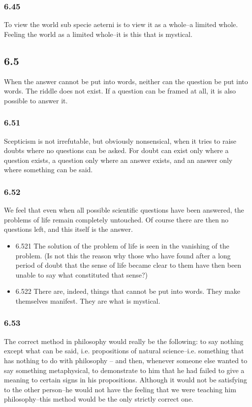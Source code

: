 \documentclass[11pt]{article}
\begin{document}
\subsubsection*{6.45}
\label{sec:orge0630ea}
To view the world sub specie aeterni is to view it as a whole--a
limited whole. Feeling the world as a limited whole--it is this that is
mystical.
\subsection*{6.5}
\label{sec:org35493cb}
When the answer cannot be put into words, neither can the question be
put into words. The riddle does not exist. If a question can be framed at
all, it is also possible to answer it.
\subsubsection*{6.51}
\label{sec:orga311633}
Scepticism is not irrefutable, but obviously nonsensical, when it
tries to raise doubts where no questions can be asked. For doubt can exist
only where a question exists, a question only where an answer exists, and
an answer only where something can be said.
\subsubsection*{6.52}
\label{sec:orgdf4ddaa}
We feel that even when all possible scientific questions have been
answered, the problems of life remain completely untouched. Of course there
are then no questions left, and this itself is the answer.
\begin{itemize}
\item 6.521
\label{sec:org1f577be}
The solution of the problem of life is seen in the vanishing of the
problem. (Is not this the reason why those who have found after a long
period of doubt that the sense of life became clear to them have then been
unable to say what constituted that sense?)
\item 6.522
\label{sec:org1f4efd2}
There are, indeed, things that cannot be put into words. They make
themselves manifest. They are what is mystical.
\end{itemize}
\subsubsection*{6.53}
\label{sec:orgcda47a9}
The correct method in philosophy would really be the following: to say
nothing except what can be said, i.e. propositions of natural science--i.e.
something that has nothing to do with philosophy -- and then, whenever
someone else wanted to say something metaphysical, to demonstrate to him
that he had failed to give a meaning to certain signs in his propositions.
Although it would not be satisfying to the other person--he would not have
the feeling that we were teaching him philosophy--this method would be the
only strictly correct one.
\end{document}
